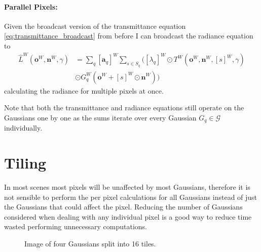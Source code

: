 \documentclass[a4paper, 11pt]{memoir}
\begin{document}
    \paragraph{Parallel Pixels:}
    \label{par:parallel_pixels}
    Given the broadcast version of the \gls{transmittance} equation \eqref{eq:transmittance_broadcast} from before I can broadcast the \gls{radiance} equation to
    \begin{equation}
        \begin{aligned}
            \hat{L}^W(\mathbf{o}^W, \mathbf{n}^W, \gamma) &= \sum_q [ \mathbf{a}_q ]^W \sum_{s \in S_q} \Big(
            [ \lambda_q ]^W \odot T^W(\mathbf{o}^W, \mathbf{n}^W, [ s ]^W, \gamma)\\
            &\odot G_q^W(\mathbf{o}^W + [ s ]^W \odot \mathbf{n}^W) \Big)
        \end{aligned}
        \label{eq:radiance_parallel_pixels}
    \end{equation}
    calculating the \gls{radiance} for multiple pixels at once.

    Note that both the \gls{transmittance} and \gls{radiance} equations still operate on the Gaussians one by one as the
    sums iterate over every Gaussian $G_q \in \mathcal{G}$ individually.

    \section{Tiling}
    \label{sec:tiling}
    In most scenes most pixels will be unaffected by most Gaussians, therefore it is not sensible to perform
    the per pixel calculations for all Gaussians instead of just the Gaussians that could affect the pixel.
    Reducing the number of Gaussians considered when dealing with any individual pixel is a good way to reduce
    time wasted performing unnecessary computations.

    \begin{figure}[t]
        \centering
        \caption{Image of four Gaussians split into 16 tiles.}
        \label{fig:tiling}
    \end{figure}
\end{document}
